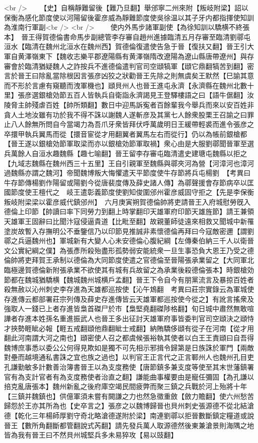 <br />
　　【史】自稱靜難留後【難乃旦翻】舉邠寧二州來附【叛岐附梁】詔以保衡為感化節度使以河陽留後霍彦威為靜難節度使吳徐温以其子牙内都指揮使知訓為淮南行軍副<br />
<br />
　　使内外馬步諸軍副使【為徐知訓以驕横不終張本】　晉王得賀德倫書命馬步副總管李存審自趙州進據臨清五月存審至臨清劉鄩屯洹水【臨清在魏州北洹水在魏州西】賀德倫復遣使告急于晉【復扶又翻】晉王引大軍自黄澤嶺東下【魏收志樂平郡遼陽縣有黄澤嶺隋改遼陽為遼山縣唐帶遼州】與存審會於臨清猶疑魏人之詐按兵不進德倫遣判官司空頲犒軍【頲它鼎翻犒苦到翻】密言於晉王曰除亂當除根因言張彦凶狡之狀勸晉王先除之則無虞矣王默然【巳諭其意而不形於言慮有窺聽而洩軍機也】頲貝州人也晉王進屯永濟【永濟縣在魏州北數十里】張彦選銀槍効節五百人皆執兵自衛詣永濟謁見王登驛樓語之曰【語牛倨翻】汝陵脅主帥殘虐百姓【帥所類翻】數日中迎馬訴寃者百餘輩我今舉兵而來以安百姓非貪人土地汝雖有功於我不得不誅以謝魏人遂斬彦及其黨七人餘衆股栗王召諭之曰罪止八人餘無所問自今當竭力為吾爪牙衆皆拜伏呼萬歲明日王緩帶輕裘而進令張彦之卒擐甲執兵翼馬而從【擐音宦從才用翻翼者翼馬左右而從行】仍以為帳前銀槍都【晉王遂以銀槍効節軍取梁而亦以銀槍効節軍取禍】衆心由是大服劉鄩聞晉軍至選兵萬餘人自洹水趣魏縣【趣七喻翻】晉王留李存審屯臨清遣史建瑭屯魏縣以拒之【九域志魏縣在魏州西三十五里】王自引親軍至魏縣與鄩夾河為營【河漳河也漳河過魏縣亦謂之魏河】帝聞魏博叛大悔懼遣天平節度使牛存節將兵屯楊劉　【考異曰牛存節傳楊劉作陽留或陽劉今從唐裴度傳及薛史諸人傳】為鄩聲援會存節病卒以匡國節度使王檀代之　岐王遣彰義節度使劉知俊圍邠州霍彦威固守拒之【先是李保衡叛岐附梁梁以霍彦威代鎮邠州】　六月庚寅朔賀德倫帥將吏請晉王入府城慰勞旣入德倫上印節【帥讀曰率下同勞力到翻上時掌翻印天雄軍府印節天雄旌節】請王兼領天雄軍王固辭曰比聞汴寇侵逼貴道【比毗至翻】故親董師徒遠來相救又聞城中新罹塗炭故暫入存撫明公不垂鑒信乃以印節見推誠非素懷德倫再拜曰今寇敵密邇【謂劉鄩之兵逼魏州也】軍城新有大變人心未安德倫心腹紀綱【左傳秦伯納三千人以衛晉文公實紀綱之僕】為張彥所殺殆盡形孤勢弱安能統衆一旦生事恐負大恩王乃受之德倫帥將吏拜賀王承制以德倫為大同節度使遣之官德倫至晉陽張承業留之【大同軍北臨極邊賀德倫新附張承業不欲使其有城有兵故留之為承業後殺德倫張本】時銀槍効節都在魏城猶驕横【魏城魏州城横戶孟翻】晉王下令自今有朋黨流言及暴掠百姓者殺無赦以沁州刺史李存進為天雄都巡按使【沁午鴆翻　考異曰莊宗實錄云為軍城使存進傳云都部署莊宗列傳及薛史存進傳皆云天雄軍都巡按使今從之】有訛言搖衆及強取人一錢已上者存進皆梟首磔尸於市【梟堅堯翻磔陟格翻】旬日城中肅然無敢喧譁者存進本姓孫名重進振武人也晉王多出征討天雄軍府事皆委判官司空頲決之頲恃才挾勢睚眦必報【睚五戒翻頲他鼎翻眦士戒翻】納賄驕侈頲有從子在河南【從才用翻此河南謂大河之南也】頲密使人召之都虞候張裕執其使者以白王王責頲曰自吾得魏博庶事悉以委公公何得見欺如是獨不可先相示邪揖令歸第是日族誅於軍門【兩敵對壘而越境通私書誅之宜也族之過也】以判官王正言代之正言鄆州人也魏州孔目吏孔謙勤敏多計數善治簿書晉王以為支度務使【唐節鎮多兼支度等使至其末世藩鎮署官有為支計官者有為支度務使者治直之翻】謙能曲事權要由是寵任彌固【為孔謙以掊克亂唐張本】魏州新亂之後府庫空竭民間疲弊而聚三鎮之兵戰於河上殆將十年【三鎮并魏鎮也】供億軍須未嘗有闕謙之力也然急徵重斂【斂力贍翻】使六州愁苦歸怨於王亦其所為也【史卒言之】張彦之以魏博歸晉也貝州刺史張源德不從北結滄德【乾化三年楊師厚劉守奇北略滄德遂附於梁】南連劉鄩以拒晉數斷鎮定糧道或說晉王【數所角翻斷都管翻說式芮翻】請先發兵萬人取源德然後東兼滄景則海隅之地皆為我有晉王曰不然貝州城堅兵多未易猝攻【易以豉翻】